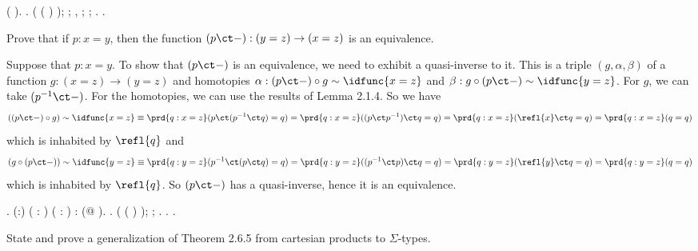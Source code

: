 \begin{coqdoccode}
\coqdocindent{1.00em}
 (  ).\coqdoceol
\coqdocnoindent
{}.\coqdoceol
\coqdocindent{1.00em}
 ( \coqdocvar{\_} (  ) \coqdocvar{\_} \coqdocvar{\_});  ;\coqdoceol
\coqdocindent{2.00em}
 , ; ; .\coqdoceol
\coqdocnoindent
{}.\coqdoceol
\coqdocemptyline
\end{coqdoccode}
Prove that if $p : x = y$, then the function $(p \ct -) : (y = z) \to (x = z)$
is an equivalence.


 \soln
Suppose that $p : x = y$.  To show that $(p \ct -)$ is an equivalence, we need
to exhibit a quasi-inverse to it.  This is a triple $(g, \alpha, \beta)$ of a
function $g:(x = z) \to (y = z)$ and homotopies $\alpha : (p \ct -) \circ g \sim
\idfunc{x=z}$ and $\beta : g \circ (p \ct -) \sim \idfunc{y=z}$.  For $g$, we
can take $(p^{-1} \ct -)$.  For the homotopies, we can use the results of Lemma
2.1.4.  So we have
\[
((p \ct -) \circ g) \sim \idfunc{x=z}
\equiv
\prd{q:x=z}(p \ct (p^{-1} \ct q) = q)
=
\prd{q:x=z}((p \ct p^{-1}) \ct q = q)
=
\prd{q:x=z}(\refl{x} \ct q = q)
=
\prd{q:x=z}(q = q)
\]
which is inhabited by $\refl{q}$ and
\[
(g \circ (p \ct -)) \sim \idfunc{y=z}
\equiv
\prd{q:y=z}(p^{-1} \ct (p \ct q) = q)
=
\prd{q:y=z}((p^{-1} \ct p) \ct q = q)
=
\prd{q:y=z}(\refl{y} \ct q = q)
=
\prd{q:y=z}(q = q)
\]
which is inhabited by $\refl{q}$.  So $(p \ct -)$ has a quasi-inverse, hence it
is an equivalence.
\begin{coqdoccode}
\coqdocemptyline
\coqdocnoindent
{} .\coqdoceol
\coqdocemptyline
\coqdocnoindent
{}  (:) (   : ) ( :  \coqdocnotation{=} ) \coqdoceol
\coqdocindent{1.00em}
:  (@     ).\coqdoceol
\coqdocnoindent
{}.\coqdoceol
\coqdocindent{1.00em}
 ( \coqdocvar{\_} ( \coqdocnotation{\^{}}) \coqdocvar{\_} \coqdocvar{\_});  ;\coqdoceol
\coqdocindent{2.00em}
 .\coqdoceol
\coqdocnoindent
{}.\coqdoceol
\coqdocemptyline
\coqdocnoindent
{} .\coqdoceol
\coqdocemptyline
\end{coqdoccode}
State and prove a generalization of Theorem 2.6.5 from cartesian products to
$\Sigma$-types.


